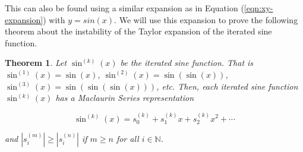 \documentclass{article}
\newtheorem{theorem}{Theorem}
\begin{document}
    This can also be found using a similar expansion as in Equation (\ref{eqn:xy-expansion}) with $y = sin(x)$. We will use this expansion to prove the following theorem about the instability of the Taylor expansion of the iterated sine function.

    \begin{theorem}
        Let $\sin^{(k)}(x)$ be the iterated sine function. That is $\sin^{(1)}(x) = \sin(x)$, $\sin^{(2)}(x) = \sin(\sin(x))$, $\sin^{(3)}(x) = \sin(\sin(\sin(x)))$, etc. Then, each iterated sine function $\sin^{(k)}(x)$ has a Maclaurin Series representation
        
        \begin{equation}
            \sin^{(k)}(x) = s_0^{(k)} + s_1^{(k)} x + s_2^{(k)} x^2 + \cdots
        \end{equation}
        
        and $\left|s_i^{(m)}\right| \geq \left|s_i^{(n)}\right|$ if $m \geq n$ for all $i \in \mathbb{N}$.
    \end{theorem}
\end{document}
